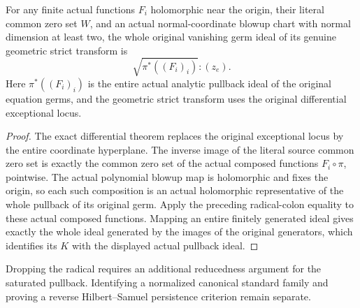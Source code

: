 \begin{theorem}
\label{hir:actual-geometric-strict-whole-radical-pullback}
\leanok
For any finite actual functions $F_i$ holomorphic near the origin, their
literal common zero set $W$, and an actual normal-coordinate blowup chart
with normal dimension at least two, the whole original vanishing germ
ideal of its genuine geometric strict transform is
\[
 \sqrt{\pi^*((F_i)_i)}:(z_e).
\]
Here $\pi^*((F_i)_i)$ is the entire actual analytic pullback ideal of
the original equation germs, and the geometric strict transform uses the
original differential exceptional locus.
\end{theorem}
\begin{proof}
The exact differential theorem replaces the original exceptional locus
by the entire coordinate hyperplane. The inverse image of the literal
source common zero set is exactly the common zero set of the actual
composed functions $F_i\circ\pi$, pointwise. The actual polynomial blowup
map is holomorphic and fixes the origin, so each such composition is an
actual holomorphic representative of the whole pullback of its original
germ. Apply the preceding radical-colon equality to these actual composed
functions. Mapping an entire finitely generated ideal gives exactly the
whole ideal generated by the images of the original generators, which
identifies its $K$ with the displayed actual pullback ideal.
\end{proof}

Dropping the radical requires an additional reducedness argument for the
saturated pullback. Identifying a normalized canonical standard family and
proving a reverse Hilbert--Samuel persistence criterion remain separate.

